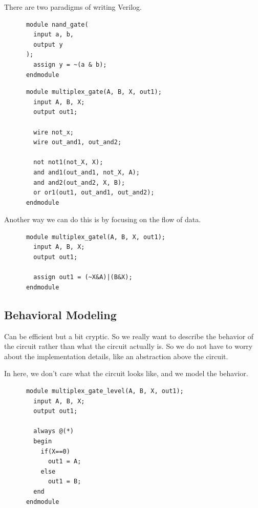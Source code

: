   There are two paradigms of writing Verilog. 
  
  \begin{definition}
    \begin{lstlisting}
      module nand_gate(
        input a, b,
        output y
      );
        assign y = ~(a & b);
      endmodule 
    \end{lstlisting}
  \end{definition}

  \begin{example}
    \begin{lstlisting}
      module multiplex_gate(A, B, X, out1); 
        input A, B, X; 
        output out1; 

        wire not_x; 
        wire out_and1, out_and2; 

        not not1(not_X, X); 
        and and1(out_and1, not_X, A); 
        and and2(out_and2, X, B); 
        or or1(out1, out_and1, out_and2); 
      endmodule
    \end{lstlisting}
  \end{example}

  Another way we can do this is by focusing on the flow of data. 

  \begin{example}
    \begin{lstlisting}
      module multiplex_gatel(A, B, X, out1); 
        input A, B, X; 
        output out1; 

        assign out1 = (~X&A)|(B&X);
      endmodule
    \end{lstlisting}
  \end{example}

\subsection{Behavioral Modeling}

  Can be efficient but a bit cryptic. So we really want to describe the behavior of the circuit rather than what the circuit actually is. So we do not have to worry about the implementation details, like an abstraction above the circuit. 

  \begin{example}
    In here, we don't care what the circuit looks like, and we model the behavior. 
    \begin{lstlisting}
      module multiplex_gate_level(A, B, X, out1); 
        input A, B, X; 
        output out1; 

        always @(*)
        begin
          if(X==0) 
            out1 = A; 
          else 
            out1 = B; 
        end
      endmodule
    \end{lstlisting}
  \end{example}

